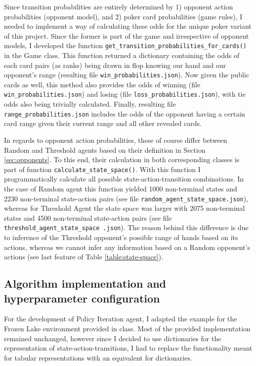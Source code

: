 Since transition probabilities are entirely determined by 1) opponent action probabilities (opponent model), and 2) poker card probabilities (game rules), I needed to implement a way of calculating these odds for the unique poker variant of this project. Since the former is part of the game and irrespective of opponent models, I developed the function \Verb|get_transition_probabilities_for_cards()| in the Game class. This function returned a dictionary containing the odds of each card pairs (as ranks) being drawn in flop knowing our hand and our opponent's range (resulting file \Verb|win_probabilities.json|). Now given the public cards as well, this method also provides the odds of winning (file \\ \Verb|win_probabilities.json|) and losing (file \Verb|loss_probabilities.json|), with tie odds also being trivially calculated. Finally, resulting file \Verb|range_probabilities.json| includes the odds of the opponent having a certain card range given their current range and all other revealed cards.

In regards to opponent action probabilities, these of course differ between Random and Threshold agents based on their definition in Section \ref{sec:opponents}. To this end, their calculation in both corresponding classes is part of function \Verb|calculate_state_space()|. With this function I programmatically calculate all possible state-action-transition combinations. In the case of Random agent this function yielded 1000 non-terminal states and 2230 non-terminal state-action pairs (see file \Verb|random_agent_state_space.json|), whereas for Threshold Agent the state space was larger with 2075 non-terminal states and 4500 non-terminal state-action pairs (see file \texttt{threshold\_agent\_state\_space .json}). The reason behind this difference is due to inference of the Threshold opponent's possible range of hands based on its actions, whereas we cannot infer any information based on a Random opponent's actions (see last feature of Table \ref{table:state-space}).

\subsection{Algorithm implementation and hyperparameter configuration}

For the development of Policy Iteration agent, I adapted the example for the Frozen Lake environment provided in class. Most of the provided implementation remained unchanged, however since I decided to use dictionaries for the representation of state-action-transitions, I had to replace the functionality meant for tabular representations with an equivalent for dictionaries.

